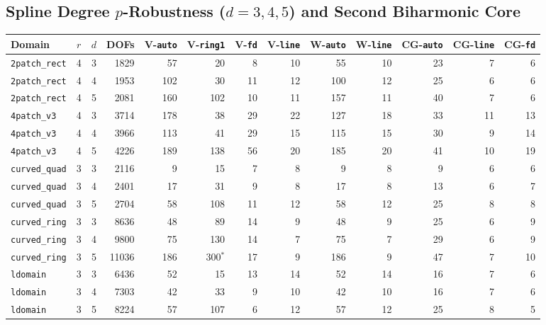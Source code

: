 \documentclass[10pt,a4paper]{article}
\begin{document}
\subsection{Spline Degree $p$-Robustness ($d = 3, 4, 5$) and Second Biharmonic Core}
\begin{center}
\scriptsize
\setlength{\tabcolsep}{3.5pt}
\begin{tabular}{@{}lccrrrrrrrrrr@{}}
\toprule
\textbf{Domain} & $r$ & $d$ & \textbf{DOFs} & \textbf{V-\texttt{auto}} & \textbf{V-\texttt{ring1}} & \textbf{V-\texttt{fd}} & \textbf{V-\texttt{line}} & \textbf{W-\texttt{auto}} & \textbf{W-\texttt{line}} & \textbf{CG-\texttt{auto}} & \textbf{CG-\texttt{line}} & \textbf{CG-\texttt{fd}} \\
\midrule
\texttt{2patch\_rect} & 4 & 3 & 1829 & 57 & 20 & 8 & 10 & 55 & 10 & 23 & 7 & 6 \\
\texttt{2patch\_rect} & 4 & 4 & 1953 & 102 & 30 & 11 & 12 & 100 & 12 & 25 & 6 & 6 \\
\texttt{2patch\_rect} & 4 & 5 & 2081 & 160 & 102 & 10 & 11 & 157 & 11 & 40 & 7 & 6 \\
\texttt{4patch\_v3} & 4 & 3 & 3714 & 178 & 38 & 29 & 22 & 127 & 18 & 33 & 11 & 13 \\
\texttt{4patch\_v3} & 4 & 4 & 3966 & 113 & 41 & 29 & 15 & 115 & 15 & 30 & 9 & 14 \\
\texttt{4patch\_v3} & 4 & 5 & 4226 & 189 & 138 & 56 & 20 & 185 & 20 & 41 & 10 & 19 \\
\texttt{curved\_quad} & 3 & 3 & 2116 & 9 & 15 & 7 & 8 & 9 & 8 & 9 & 6 & 6 \\
\texttt{curved\_quad} & 3 & 4 & 2401 & 17 & 31 & 9 & 8 & 17 & 8 & 13 & 6 & 7 \\
\texttt{curved\_quad} & 3 & 5 & 2704 & 58 & 108 & 11 & 12 & 58 & 12 & 25 & 8 & 8 \\
\texttt{curved\_ring} & 3 & 3 & 8636 & 48 & 89 & 14 & 9 & 48 & 9 & 25 & 6 & 9 \\
\texttt{curved\_ring} & 3 & 4 & 9800 & 75 & 130 & 14 & 7 & 75 & 7 & 29 & 6 & 9 \\
\texttt{curved\_ring} & 3 & 5 & 11036 & 186 & 300$^*$ & 17 & 9 & 186 & 9 & 47 & 7 & 10 \\
\texttt{ldomain} & 3 & 3 & 6436 & 52 & 15 & 13 & 14 & 52 & 14 & 16 & 7 & 6 \\
\texttt{ldomain} & 3 & 4 & 7303 & 42 & 33 & 9 & 10 & 42 & 10 & 16 & 7 & 6 \\
\texttt{ldomain} & 3 & 5 & 8224 & 57 & 107 & 6 & 12 & 57 & 12 & 25 & 8 & 5 \\

\end{tabular}
\end{center}
\end{document}
